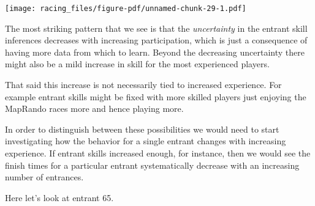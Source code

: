 \documentclass[
  letterpaper,
  DIV=11,
  numbers=noendperiod]{scrartcl}
\begin{document}
\texttt{[image: racing\_files/figure-pdf/unnamed-chunk-29-1.pdf]}

The most striking pattern that we see is that the \emph{uncertainty} in
the entrant skill inferences decreases with increasing participation,
which is just a consequence of having more data from which to learn.
Beyond the decreasing uncertainty there might also be a mild increase in
skill for the most experienced players.

That said this increase is not necessarily tied to increased experience.
For example entrant skills might be fixed with more skilled players just
enjoying the MapRando races more and hence playing more.

In order to distinguish between these possibilities we would need to
start investigating how the behavior for a single entrant changes with
increasing experience. If entrant skills increased enough, for instance,
then we would see the finish times for a particular entrant
systematically decrease with an increasing number of entrances.

Here let's look at entrant 65.
\end{document}
